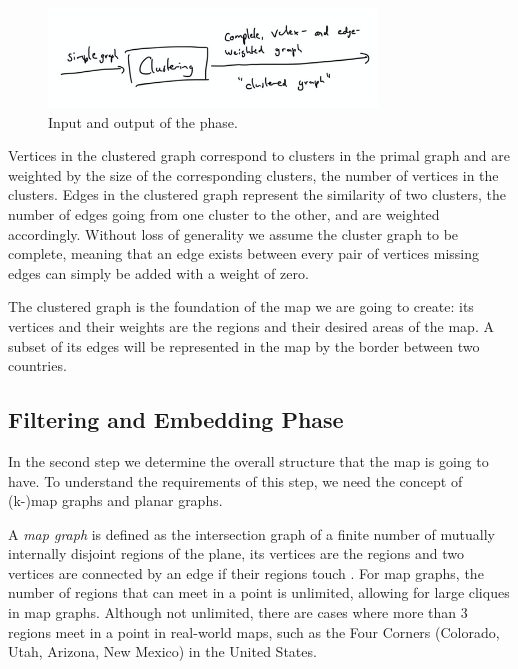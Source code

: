 \begin{figure}[H]
	\centering\includegraphics[height=100px]{Resources/Pipeline-Clustering.png}
	\caption{Input and output of the  phase.}
	\label{fig:pipeline-static}
\end{figure}

Vertices in the clustered graph correspond to clusters in the primal graph and are weighted by the size of the corresponding clusters, \ie{} the number of vertices in the clusters. Edges in the clustered graph represent the similarity of two clusters, \ie{} the number of edges going from one cluster to the other, and are weighted accordingly. Without loss of generality we assume the cluster graph to be complete, meaning that an edge exists between every pair of vertices \emdash{} missing edges can simply be added with a weight of zero.

The clustered graph is the foundation of the map we are going to create: its vertices and their weights are the regions and their desired areas of the map. A subset of its edges will be represented in the map by the border between two countries.




\subsection{Filtering and Embedding Phase}

In the second step we determine the overall structure that the map is going to have. To understand the requirements of this step, we need the concept of (k-)map graphs and planar graphs.

A \emph{map graph} is defined as the intersection graph of a finite number of mutually internally disjoint regions of the plane, \ie{} its vertices are the regions and two vertices are connected by an edge if their regions touch \cite{chen2002map}. For map graphs, the number of regions that can meet in a point is unlimited, allowing for large cliques in map graphs. Although not unlimited, there are cases where more than 3 regions meet in a point in real-world maps, such as the Four Corners (Colorado, Utah, Arizona, New Mexico) in the United States.

